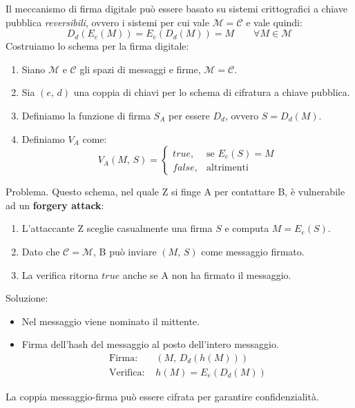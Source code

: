 \documentclass[a4paper, 11pt, twoside, openright, fleqn]{report}
\begin{document}
\noindent Il meccanismo di firma digitale può essere basato su sistemi crittografici a chiave pubblica \emph{reversibili}, ovvero i sistemi per cui vale $\mathcal{M} = \mathcal{C}$ e vale quindi:
\begin{equation*}
	D_d(E_e(M)) = E_e(D_d(M)) = M\qquad \forall M\in\mathcal{M}
\end{equation*}
Costruiamo lo schema per la firma digitale:
\begin{enumerate}
	\item Siano $\mathcal{M}$ e $\mathcal{C}$ gli spazi di messaggi e firme, $\mathcal{M} = \mathcal{C}$.
	\item Sia $(e,\,d)$ una coppia di chiavi per lo schema di cifratura a chiave pubblica.
	\item Definiamo la funzione di firma $S_A$ per essere $D_d$, ovvero $S=D_d(M)$.
	\item Definiamo $V_A$ come:
	\begin{equation*}
		V_A(M,\,S) =
		\begin{cases}
		true,& \mbox{se }E_e(S) = M\\
		false,& \mbox{altrimenti}
		\end{cases}
	\end{equation*}
\end{enumerate}
Problema. Questo schema, nel quale Z si finge A per contattare B, è vulnerabile ad un \textbf{forgery attack}:
\begin{enumerate}
	\item L'attaccante Z sceglie casualmente una firma $S$ e computa $M=E_e(S)$.
	\item Dato che $\mathcal{C} = \mathcal{M}$, B può inviare $(M,\,S)$ come messaggio firmato.
	\item La verifica ritorna $true$ anche se A non ha firmato il messaggio.
\end{enumerate}
Soluzione:
\begin{itemize}
	\item Nel messaggio viene nominato il mittente.
	\item Firma dell'hash del messaggio al posto dell'intero messaggio.
	\begin{align*}
		\mbox{Firma: } &(M,\,D_d(h(M)))\\
		\mbox{Verifica: } &h(M) = E_e(D_d(M))
	\end{align*}
\end{itemize}
La coppia messaggio-firma può essere cifrata per garantire confidenzialità.
\end{document}
